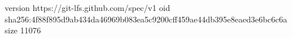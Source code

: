 version https://git-lfs.github.com/spec/v1
oid sha256:4f88f895d9ab434da46969b083ea5c9200cff459ae44db395e8eaed3e6bc6c6a
size 11076
